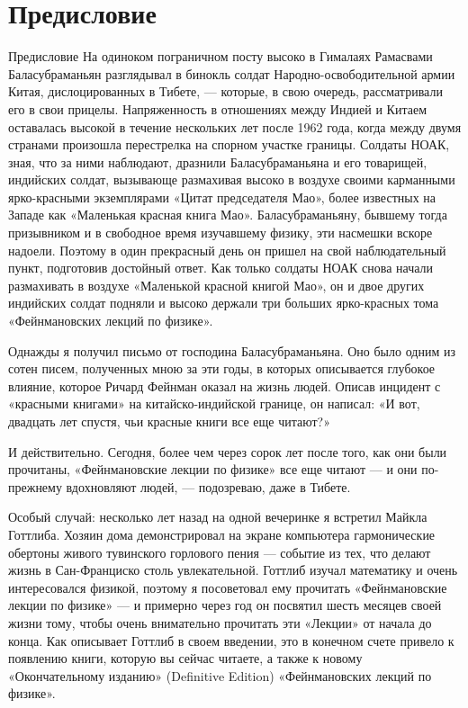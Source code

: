 \documentclass[10pt,oneside]{article}
\begin{document}
\clearpage
{}
\section*{Предисловие}
\label{tips-sec-2-предисловие}
Предисловие На одиноком пограничном посту высоко в Гималаях Рамасвами Баласубраманьян разглядывал в бинокль солдат Народно-освободительной армии Китая, дислоцированных в Тибете, --- которые, в свою очередь, рассматривали его в свои прицелы. Напряженность в отношениях между Индией и Китаем оставалась высокой в течение нескольких лет после 1962 года, когда между двумя странами произошла перестрелка на спорном участке границы. Солдаты НОАК, зная, что за ними наблюдают, дразнили Баласубраманьяна и его товарищей, индийских солдат, вызывающе размахивая высоко в воздухе своими карманными ярко-красными экземплярами «Цитат председателя Мао», более известных на Западе как «Маленькая красная книга Мао». Баласубраманьяну, бывшему тогда призывником и в свободное время изучавшему физику, эти насмешки вскоре надоели. Поэтому в один прекрасный день он пришел на свой наблюдательный пункт, подготовив достойный ответ. Как только солдаты НОАК снова начали размахивать в воздухе «Маленькой красной книгой Мао», он и двое других индийских солдат подняли и высоко держали три больших ярко-красных тома «Фейнмановских лекций по физике».\par

Однажды я получил письмо от господина Баласубраманьяна. Оно было одним из сотен писем, полученных мною за эти годы, в которых описывается глубокое влияние, которое Ричард Фейнман оказал на жизнь людей. Описав инцидент с «красными книгами» на китайско-индийской границе, он написал: «И вот, двадцать лет спустя, чьи красные книги все еще читают?»\par

И действительно. Сегодня, более чем через сорок лет после того, как они были прочитаны, «Фейнмановские лекции по физике» все еще читают --- и они по-прежнему вдохновляют людей, --- подозреваю, даже в Тибете.\par

Особый случай: несколько лет назад на одной вечеринке я встретил Майкла Готтлиба. Хозяин дома демонстрировал на экране компьютера гармонические обертоны живого тувинского горлового пения --- событие из тех, что делают жизнь в Сан-Франциско столь увлекательной. Готтлиб изучал математику и очень интересовался физикой, поэтому я посоветовал ему прочитать «Фейнмановские лекции по физике» --- и примерно через год он посвятил шесть месяцев своей жизни тому, чтобы очень внимательно прочитать эти «Лекции» от начала до конца. Как описывает Готтлиб в своем введении, это в конечном счете привело к появлению книги, которую вы сейчас читаете, а также к новому «Окончательному изданию» (Definitive Edition) «Фейнмановских лекций по физике».\par
\end{document}

